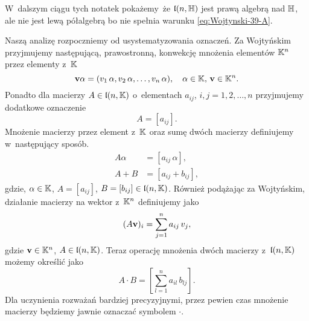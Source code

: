 \documentclass[a4paper,11pt]{article}
\begin{document}
W~dalszym ciągu tych notatek pokażemy~że $\mathfrak{l}( n, \mathbb{H} )$ jest prawą
algebrą nad $\mathbb{H}$, ale nie jest lewą półalgebrą bo nie spełnia warunku
\eqref{eq:Wojtynski-39-A}.

Naszą analizę rozpoczniemy od usystematyzowania oznaczeń. Za Wojtyńskim
przyjmujemy następującą, prawostronną, konwekcję mnożenia elementów
$\mathbb{K}^{ n }$ przez elementy z~$\mathbb{K}$
\begin{equation}
  \label{eq:Wojtynski-40}
  \mathbf{v} \alpha = ( v_{ 1 } \, \alpha, v_{ 2 } \, \alpha, \ldots, v_{ n } \, \alpha ), \quad
  \alpha \in \mathbb{K}, \, \mathbf{v} \in \mathbb{K}^{ n }.
\end{equation}
Ponadto dla macierzy $A \in \mathfrak{l}( n, \mathbb{K} )$ o~elementach $a_{ ij }$,
$i, j = 1, 2, \ldots, n$ przyjmujemy dodatkowe oznaczenie
\begin{equation}
  \label{eq:Wojtynski-41}
  A = [ a_{ i j } ].
\end{equation}
Mnożenie macierzy przez element z~$\mathbb{K}$ oraz sumę dwóch macierzy
definiujemy w~następujący sposób.
\begin{subequations}
  \begin{align}
    \label{eq:Wojtynski-42-A}
    A \alpha &= [ a_{ i j } \, \alpha ], \\
    \label{eq:Wojtynski-42-B}
    A + B &= [ a_{ i j } + b_{ i j } ],
  \end{align}
\end{subequations}
gdzie, $\alpha \in \mathbb{K}$, $A = [ a_{ i j } ]$,
$B = [ b_{ i j } ] \in \mathfrak{l}( n, \mathbb{K} )$.
Również podążając za Wojtyńskim, działanie macierzy na wektor z~$\mathbb{K}^{ n }$
definiujemy jako
\begin{equation}
  \label{eq:Wojtynski-43}
  ( A \mathbf{v} )_{ i } = \sum_{ j = 1 }^{ n } a_{ i j } \, v_{ j },
\end{equation}
gdzie $\mathbf{v} \in \mathbb{K}^{ n }$, $A \in \mathfrak{l}( n, \mathbb{K} )$. Teraz operację mnożenia
dwóch macierzy z~$\mathfrak{l}( n, \mathbb{K} )$ możemy określić jako
\begin{equation}
  \label{eq:Wojtynski-44}
  A \cdot B = \left[ \sum_{ l = 1 }^{ n } a_{ i l } \, b_{ l j } \right].
\end{equation}
Dla uczynienia rozważań bardziej precyzyjnymi, przez pewien czas mnożenie
macierzy będziemy jawnie oznaczać symbolem $\cdot$.
\end{document}
